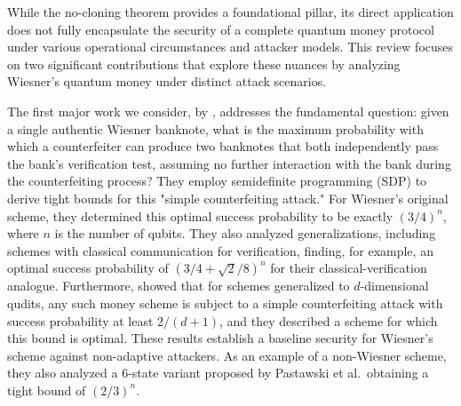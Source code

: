 \documentclass{article} %
\begin{document}
While the no-cloning theorem provides a foundational pillar, its direct application does not fully encapsulate the security of a complete quantum money protocol under various operational circumstances and attacker models. This review focuses on two significant contributions that explore these nuances by analyzing Wiesner's quantum money under distinct attack scenarios.

The first major work we consider, by \citet{Molina2012Optimal}, addresses the fundamental question: given a single authentic Wiesner banknote, what is the maximum probability with which a counterfeiter can produce two banknotes that both independently pass the bank's verification test, assuming no further interaction with the bank during the counterfeiting process? They employ semidefinite programming (SDP) to derive tight bounds for this "simple counterfeiting attack." For Wiesner's original scheme, they determined this optimal success probability to be exactly $(3/4)^n$, where $n$ is the number of qubits. They also analyzed generalizations, including schemes with classical communication for verification, finding, for example, an optimal success probability of $(3/4 + \sqrt{2}/8)^n$ for their classical-verification analogue. Furthermore, \citet{Molina2012Optimal} showed that for schemes generalized to $d$-dimensional qudits, any such money scheme is subject to a simple counterfeiting attack with success probability at least $2/(d+1)$, and they described a scheme for which this bound is optimal. These results establish a baseline security for Wiesner's scheme against non-adaptive attackers. As an example of a non-Wiesner scheme, they also analyzed a 6-state variant proposed by Pastawski et al.\ obtaining a tight bound of $(2/3)^n$.
\end{document}
